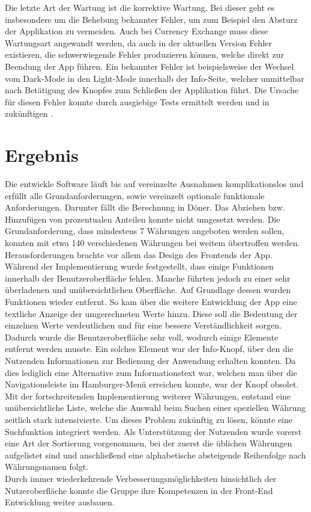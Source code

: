 \documentclass[conference]{IEEEtran}
\begin{document}
Die letzte Art der Wartung ist die korrektive Wartung. Bei dieser geht es insbesondere um die Behebung bekannter Fehler, um zum Beispiel den Absturz der Applikation zu vermeiden. Auch bei Currency Exchange muss diese Wartungsart angewandt werden, da auch in der aktuellen Version Fehler existieren, die schwerwiegende Fehler produzieren können, welche direkt zur Beendung der App führen. Ein bekannter Fehler ist beispielsweise der Wechsel vom Dark-Mode in den Light-Mode innerhalb der Info-Seite, welcher unmittelbar nach Betätigung des Knopfes zum Schließen der Applikation führt. Die Ursache für diesen Fehler konnte durch ausgiebige Tests ermittelt werden und in zukünftigen . 

\section{Ergebnis}

Die entwickle Software läuft bis auf vereinzelte Ausnahmen komplikationslos und erfüllt alle Grundanforderungen, sowie vereinzelt optionale funktionale Anforderungen. Darunter fällt die Berechnung in Döner.  Das Abziehen bzw. Hinzufügen von prozentualen Anteilen konnte nicht umgesetzt werden. Die Grundanforderung, dass mindestens 7 Währungen angeboten werden sollen, konnten mit etwa 140 verschiedenen Währungen bei weitem übertroffen werden.\\
Herausforderungen brachte vor allem das Design des Frontends der App. Während der Implementierung wurde festgestellt, dass einige Funktionen innerhalb der Benutzeroberfläche fehlen. Manche führten jedoch zu einer sehr überladenen und unübersichtlichen Oberfläche. Auf Grundlage dessen wurden Funktionen wieder entfernt. So kam über die weitere Entwicklung der App eine textliche Anzeige der umgerechneten Werte hinzu. Diese soll die Bedeutung der einzelnen Werte verdeutlichen und für eine bessere Verständlichkeit sorgen. Dadurch wurde die Benutzeroberfläche sehr voll, wodurch einige Elemente entfernt werden musste. Ein solches Element war der Info-Knopf, über den die Nutzenden Informationen zur Bedienung der Anwendung erhalten konnten. Da dies lediglich eine Alternative zum Informationstext war, welchen man über die Navigationsleiste im Hamburger-Menü erreichen konnte, war der Knopf obsolet. \\
Mit der fortschreitenden Implementierung weiterer Währungen, entstand eine unübersichtliche Liste, welche die Auswahl beim Suchen einer speziellen Währung zeitlich stark intensivierte. Um dieses Problem zukünftig zu lösen, könnte eine Suchfunktion integriert werden. Als Unterstützung der Nutzenden wurde vorerst eine Art der Sortierung vorgenommen, bei der zuerst die üblichen Währungen aufgelistet sind und anschließend eine alphabetische absteigende Reihenfolge nach Währungsnamen folgt. \\
Durch immer wiederkehrende Verbesserungsmöglichkeiten hinsichtlich der Nutzeroberfläche konnte die Gruppe ihre Kompetenzen in der Front-End Entwicklung weiter ausbauen.
\end{document}
